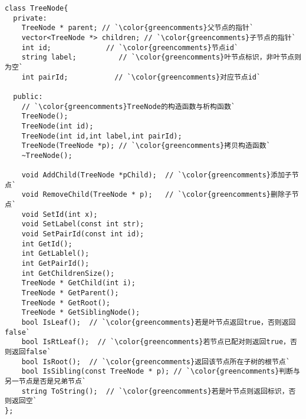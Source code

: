 
\begin{CJK}{UTF8}{gbsn}
\begin{lstlisting}
class TreeNode{
  private:
    TreeNode * parent; // `\color{greencomments}父节点的指针`
    vector<TreeNode *> children; // `\color{greencomments}子节点的指针`
    int id;             // `\color{greencomments}节点id`
    string label;          // `\color{greencomments}叶节点标识，非叶节点则为空`
    int pairId;           // `\color{greencomments}对应节点id`

  public:
    // `\color{greencomments}TreeNode的构造函数与析构函数`
    TreeNode();
    TreeNode(int id);
    TreeNode(int id,int label,int pairId);
    TreeNode(TreeNode *p); // `\color{greencomments}拷贝构造函数`
    ~TreeNode();

    void AddChild(TreeNode *pChild);  // `\color{greencomments}添加子节点`
    void RemoveChild(TreeNode * p);   // `\color{greencomments}删除子节点`
    void SetId(int x);      
    void SetLabel(const int str);
    void SetPairId(const int id);
    int GetId();
    int GetLablel();
    int GetPairId();    
    int GetChildrenSize();
    TreeNode * GetChild(int i);
    TreeNode * GetParent();
    TreeNode * GetRoot();    
    TreeNode * GetSiblingNode();
    bool IsLeaf();  // `\color{greencomments}若是叶节点返回true，否则返回false`
    bool IsRtLeaf();  // `\color{greencomments}若节点已配对则返回true，否则返回false`
    bool IsRoot();  // `\color{greencomments}返回该节点所在子树的根节点`
    bool IsSibling(const TreeNode * p); // `\color{greencomments}判断与另一节点是否是兄弟节点`
    string ToString();  // `\color{greencomments}若是叶节点则返回标识，否则返回空`
};
\end{lstlisting}
\end{CJK}